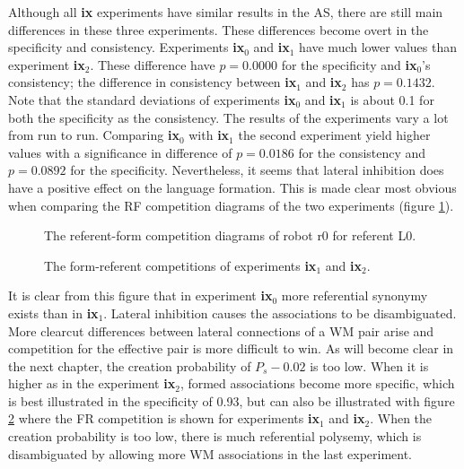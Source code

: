 Although all {\bf ix} experiments have similar results in the AS, there are still main differences in these three experiments. These differences become overt in the specificity and consistency. Experiments {\bf ix$_0$} and {\bf ix$_1$} have much lower values than experiment {\bf ix$_2$}. These difference have $p=0.0000$ for the specificity and {\bf ix$_0$}'s consistency; the difference in consistency between {\bf ix$_1$} and {\bf ix$_2$} has $p=0.1432$.  Note that the standard deviations of experiments {\bf ix$_0$} and {\bf ix$_1$} is about 0.1 for both the specificity as the consistency. The results of the experiments vary a lot from run to run. Comparing {\bf ix$_0$} with {\bf ix$_1$} the second experiment yield higher values with a significance in difference of $p=0.0186$ for the consistency and $p=0.0892$ for the specificity. Nevertheless, it seems that lateral inhibition does have a positive effect on the language formation. This is made clear most obvious when comparing the RF competition diagrams of the two experiments (figure \ref{f:feed:comp}).

\begin{figure}
\centering
{}
\caption{The referent-form competition diagrams of robot r0 for referent L0.}
\label{f:feed:comp}
\end{figure}

\begin{figure}
\centering
{}
\caption{The form-referent competitions of experiments {\bf ix$_1$} and {\bf ix$_2$}.}
\label{f:feed:comp1}
\end{figure}

It is clear from this figure that in experiment {\bf ix$_0$} more referential synonymy exists than in {\bf ix$_1$}. Lateral inhibition causes the associations to be disambiguated. More clearcut differences between lateral connections of a WM pair arise and competition for the effective pair is more difficult to win. As will become clear in the next chapter, the creation probability of $P_s-0.02$ is too low. When it is higher as in the experiment {\bf ix$_2$}, formed associations become more specific, which is best illustrated in the specificity of 0.93, but can also be illustrated with figure \ref{f:feed:comp1} where the FR competition is shown for experiments {\bf ix$_1$} and {\bf ix$_2$}. When the creation probability is too low, there is much referential polysemy, which is disambiguated by allowing more WM associations in the last experiment.

